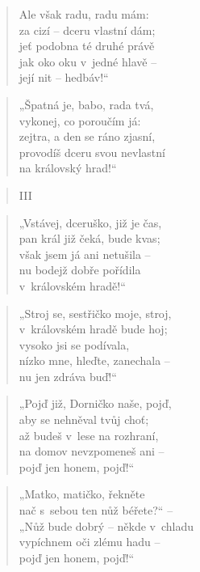 \begin{verse}
Ale však radu, radu mám: \\
za cizí -- dceru vlastní dám; \\
jeť podobna té druhé právě \\
jak oko oku v~jedné hlavě -- \\
její nit -- hedbáv!“
\end{verse}

\begin{verse}
„Špatná je, babo, rada tvá, \\
vykonej, co poroučím já: \\
zejtra, a den se ráno zjasní, \\
provodíš dceru svou nevlastní \\
na královský hrad!“
\end{verse}

\begin{verse}
III
\end{verse}

\begin{verse}
„Vstávej, dceruško, již je čas, \\
pan král již čeká, bude kvas; \\
však jsem já ani netušila -- \\
nu bodejž dobře pořídila \\
v~královském hradě!“
\end{verse}

\begin{verse}
„Stroj se, sestřičko moje, stroj, \\
v~královském hradě bude hoj; \\
vysoko jsi se podívala, \\
nízko mne, hleďte, zanechala -- \\
nu jen zdráva buď!“
\end{verse}

\begin{verse}
„Pojď již, Dorničko naše, pojď, \\
aby se nehněval tvůj choť; \\
až budeš v~lese na rozhraní, \\
na domov nevzpomeneš ani -- \\
pojď jen honem, pojď!“
\end{verse}

\begin{verse}
„Matko, matičko, řekněte \\
nač s~sebou ten nůž béřete?“ -- \\
„Nůž bude dobrý -- někde v~chladu \\
vypíchnem oči zlému hadu -- \\
pojď jen honem, pojď!“
\end{verse}

